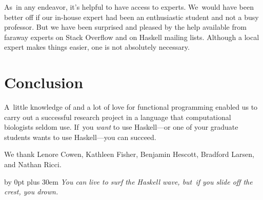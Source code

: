 \documentclass[preprint,nonatbib,blockstyle,nocopyrightspace,times]{sigplanconf}
\begin{document}


As~in any endeavor, it's helpful to have access to experts.
We~would have been better off if our in-house expert had been an
enthusiastic student and not a busy professor.
But we have been surprised and pleased by the help available from
faraway experts on Stack Overflow and on Haskell mailing lists.
Although a local expert makes things easier, one is not
 absolutely necessary.


\section{Conclusion}

A~little knowledge of and a lot of love for functional programming
enabled us to carry out a successful research project in a language
that computational biologists seldom use.
If~you \emph{want} to use Haskell---or one of your graduate students
wants to use Haskell---you can
succeed. 




%  

 

\ifnotcutting
\acks

We thank Lenore Cowen, Kathleen Fisher, Benjamin Hescott, Bradford
Larsen, and Nathan Ricci. 
\fi







\iffinaldraft


\vfill

\begingroup
\parfillskip=0pt
\advance\leftskip by 0pt plus 30em
\emph{You can live to surf the Haskell wave, but~if you slide off the crest, you
drown.}
\par
\endgroup

\fi
\end{document}
